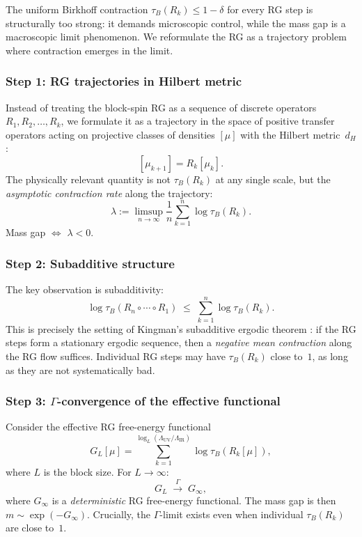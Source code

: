 \documentclass[12pt,a4paper]{article}
\theoremstyle{definition}
\theoremstyle{plain}
\theoremstyle{remark}
\begin{document}
The uniform Birkhoff contraction $\tau_B(R_k) \leq 1 - \delta$ for every RG step is structurally too strong: it demands microscopic control, while the mass gap is a macroscopic limit phenomenon. We reformulate the RG as a trajectory problem where contraction emerges in the limit.

\subsubsection*{Step 1: RG trajectories in Hilbert metric}

Instead of treating the block-spin RG as a sequence of discrete operators $R_1, R_2, \ldots, R_k$, we formulate it as a trajectory in the space of positive transfer operators acting on projective classes of densities $[\mu]$ with the Hilbert metric~$d_H$:
\[
  [\mu_{k+1}] = R_k[\mu_k].
\]
The physically relevant quantity is not $\tau_B(R_k)$ at any single scale, but the \emph{asymptotic contraction rate} along the trajectory:
\begin{equation}\label{eq:lyapunov-rg}
  \lambda := \limsup_{n \to \infty} \frac{1}{n} \sum_{k=1}^{n} \log \tau_B(R_k).
\end{equation}
Mass gap $\Leftrightarrow$ $\lambda < 0$.

\subsubsection*{Step 2: Subadditive structure}

The key observation is subadditivity:
\begin{equation}\label{eq:subadditive}
  \log \tau_B(R_n \circ \cdots \circ R_1) \;\leq\; \sum_{k=1}^{n} \log \tau_B(R_k).
\end{equation}
This is precisely the setting of Kingman's subadditive ergodic theorem \cite{Kingman1968}: if the RG steps form a stationary ergodic sequence, then a \emph{negative mean contraction} along the RG flow suffices. Individual RG steps may have $\tau_B(R_k)$ close to~$1$, as long as they are not systematically bad.

\subsubsection*{Step 3: $\Gamma$-convergence of the effective functional}

Consider the effective RG free-energy functional
\begin{equation}\label{eq:rg-functional}
  G_L[\mu] = \sum_{k=1}^{\log_L(\Lambda_{\mathrm{UV}}/\Lambda_{\mathrm{IR}})} \log \tau_B(R_k[\mu]),
\end{equation}
where $L$ is the block size. For $L \to \infty$:
\[
  G_L \;\xrightarrow{\;\Gamma\;}\; G_\infty,
\]
where $G_\infty$ is a \emph{deterministic} RG free-energy functional. The mass gap is then $m \sim \exp(-G_\infty)$. Crucially, the $\Gamma$-limit exists even when individual $\tau_B(R_k)$ are close to~$1$.
\end{document}
